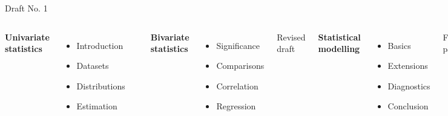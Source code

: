 \documentclass[t]{beamer}
\begin{document}
	\begin{frame}[t]{Draft No. 1}
	
	\begin{columns}[T]

			\textbf{Univariate\\statistics}\\[.5em]
	
			\begin{itemize}
				\item Introduction
				\item Datasets
				\item Distributions
				\item Estimation
			\end{itemize}

			\begin{center}
				\\[.5em]
			\end{center}
		
		
			\textbf{Bivariate\\statistics}
	
			\begin{itemize}
				\item Significance
				\item Comparisons
				\item Correlation
				\item Regression
			\end{itemize}

			\begin{center}
				Revised draft\\[.5em]
			\end{center}
		

			\textbf{Statistical\\modelling}
	
			\begin{itemize}
				\item Basics
				\item Extensions
				\item Diagnostics
				\item Conclusion
			\end{itemize}

			\begin{center}
				Final paper\\[.5em]
			\end{center}
			
	\end{columns}
		
	\end{frame}
\end{document}
